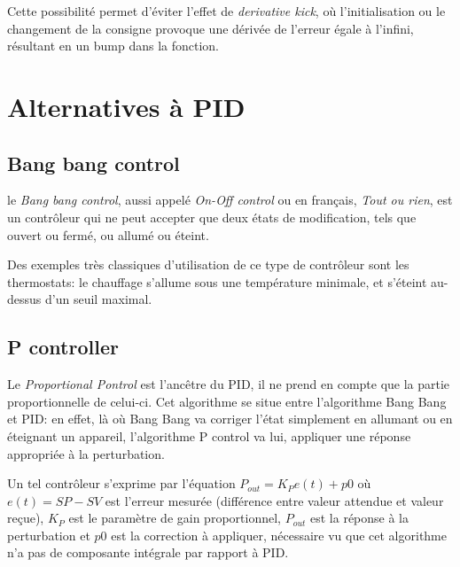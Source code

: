 Cette possibilité permet d'éviter l'effet de \emph{derivative kick}, où l'initialisation ou le changement de la consigne provoque une dérivée de l'erreur égale à l'infini, résultant en un bump dans la fonction.




\section{Alternatives à PID}

\subsection{Bang bang control}
le \emph{Bang bang control}, aussi appelé \emph{On-Off control} ou en français, \emph{Tout ou rien}, est un contrôleur qui ne peut accepter que deux états de modification, tels que ouvert ou fermé, ou allumé ou éteint.

Des exemples très classiques d'utilisation de ce type de contrôleur sont les thermostats: le chauffage s'allume sous une température minimale, et s'éteint au-dessus d'un seuil maximal.

\subsection{P controller}
Le \emph{Proportional Pontrol} est l'ancêtre du PID, il ne prend en compte que la partie proportionnelle de celui-ci.
Cet algorithme se situe entre l'algorithme Bang Bang et PID:
en effet, là où Bang Bang va corriger l'état simplement en allumant ou en éteignant un appareil, l'algorithme P control va lui, appliquer une réponse appropriée à la perturbation.

Un tel contrôleur s'exprime par l'équation $P_{out} = K_{P}e(t) + p0$ où $e(t) = SP - SV$ est l'erreur mesurée (différence entre valeur attendue et valeur reçue), $K_{P}$ est le paramètre de gain proportionnel, $P_{out}$ est la réponse à la perturbation et $p0$ est la correction à appliquer, nécessaire vu que cet algorithme n'a pas de composante intégrale par rapport à PID.

